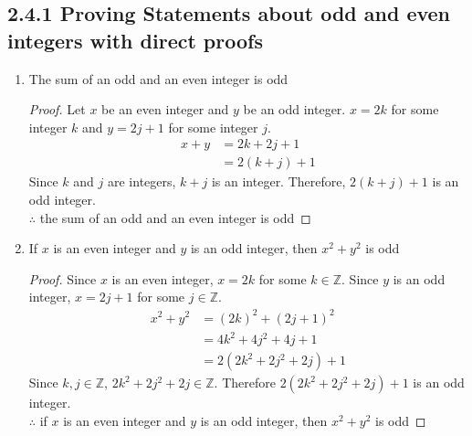 \documentclass{article}
\newcommand{\bld}{\textbf}
\newcommand{\bb}{\mathbb}
\newcommand{\bitem}[1]{\item[\bld{#1.}]}
\begin{document}
\subsection*{2.4.1 Proving Statements about odd and even integers with direct proofs}
\begin{enumerate}
  \bitem{a} The sum of an odd and an even integer is odd
  \begin{proof}
    Let $x$ be an even integer and $y$ be an odd integer. $x=2k$ for some integer $k$ and $y=2j+1$ for some integer $j$.
    \begin{align*}
      x + y & = 2k + 2j +1 \\
            & = 2(k+j)+1
    \end{align*}
    Since $k$ and $j$ are integers, $k+j$ is an integer. Therefore, $2(k+j)+1$ is an odd integer. \\
    $\therefore$ the sum of an odd and an even integer is odd
  \end{proof}
  \bitem{e} If $x$ is an even integer and $y$ is an odd integer, then $x^2+y^2$ is odd
  \begin{proof}
    Since $x$ is an even integer, $x = 2k$ for some $k \in \bb{Z}$.
    Since $y$ is an odd integer, $x = 2j + 1$ for some $j \in \bb{Z}$.
    \begin{align*}
      x^2+y^2 & = (2k)^2 + (2j+1)^2       \\
              & = 4k^2 + 4j^2 + 4j + 1    \\
              & = 2(2k^2 + 2j^2 + 2j) + 1
    \end{align*}
    Since $k,j \in \bb{Z}$, $2k^2 + 2j^2 + 2j \in \bb{Z}$. Therefore $2(2k^2 + 2j^2 + 2j) + 1$ is an odd integer. \\
    $\therefore$ if $x$ is an even integer and $y$ is an odd integer, then $x^2+y^2$ is odd
  \end{proof}
\end{enumerate}
\end{document}
